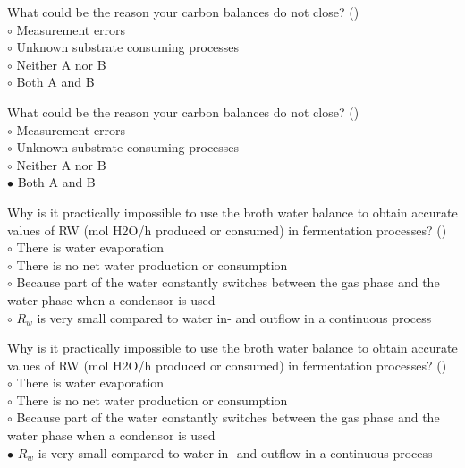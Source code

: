 \documentclass[]{beamer}
\begin{document}
\begin{frame}[shrink] {}
\addtocounter{questions}{1}
\color{blue}
What could be the reason your carbon balances do not close?  ()\\
\color{black}
\setlength{\parindent}{-0.4cm}
{\color{red}$\circ$}    Measurement errors\\
{\color{red}$\circ$} Unknown substrate consuming processes\\
{\color{red}$\circ$} Neither A nor B \\
{\color{red}$\circ$} Both A and B   \\
\end{frame}
\begin{frame}[shrink] {}
\addtocounter{answers}{1}
\color{blue}
What could be the reason your carbon balances do not close?  ()\\
\color{black}
\setlength{\parindent}{-0.4cm}
{\color{red}$\circ$}    Measurement errors\\
{\color{red}$\circ$} Unknown substrate consuming processes\\
{\color{red}$\circ$} Neither A nor B \\
{\color{red}$\bullet$} Both A and B   \\
\end{frame}

\begin{frame}[shrink] {}
\addtocounter{questions}{1}
\color{blue}
Why is it practically impossible to use the broth water balance to obtain accurate values of RW (mol H2O/h produced or consumed) in fermentation processes?  ()\\
\color{black}
\setlength{\parindent}{-0.4cm}
{\color{red}$\circ$}    There is water evaporation\\
{\color{red}$\circ$} There is no net water production or consumption  \\
{\color{red}$\circ$} Because part of the water constantly switches between the gas phase and the water phase when a condensor is used \\
{\color{red}$\circ$} $R_w$ is very small compared to water in- and outflow in a continuous process
\end{frame}
\begin{frame}[shrink] {}
\addtocounter{answers}{1}
\color{blue}
Why is it practically impossible to use the broth water balance to obtain accurate values of RW (mol H2O/h produced or consumed) in fermentation processes?  ()\\
\color{black}
\setlength{\parindent}{-0.4cm}
{\color{red}$\circ$}    There is water evaporation\\
{\color{red}$\circ$} There is no net water production or consumption  \\
{\color{red}$\circ$} Because part of the water constantly switches between the gas phase and the water phase when a condensor is used \\
{\color{red}$\bullet$} $R_w$ is very small compared to water in- and outflow in a continuous process
\end{frame}
\end{document}
